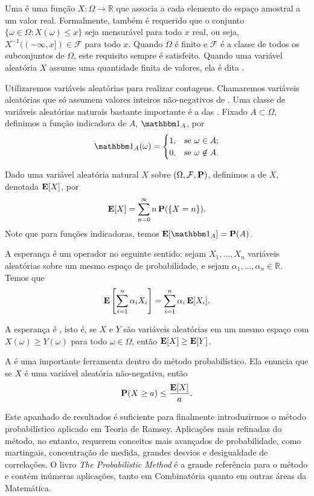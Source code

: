 Uma  é uma função $X: \Omega \to \mathbb{R}$ que associa a cada elemento do espaço amostral a um valor real. Formalmente, também é requerido que o conjunto $\{ \omega \in \Omega : X(\omega) \leq x \}$ seja mensurável para todo $x$ real, ou seja, $X^{-1}( (-\infty,x]) \in \mathcal{F}$ para todo $x$. Quando $\Omega$ é finito e $\mathcal{F}$ é a classe de todos os subconjuntos de $\Omega$, este requisito sempre é satisfeito. Quando uma variável aleatória $X$ assume uma quantidade finita de valores, ela é dita .

Utilizaremos variáveis aleatórias para realizar contagens. Chamaremos  variáveis aleatórias que só assumem valores inteiros não-negativos de . Uma classe de variáveis aleatórias naturais bastante importante é a das . Fixado $A \subset \Omega$, definimos a função indicadora de $A$, $\ind{A}$, por
\[ \ind{A}(\omega) = \begin{cases}
  1, & \text{se } \omega \in A; \\
  0, & \text{se } \omega \not\in A.
\end{cases}\]

Dado uma variável aleatória natural $X$ sobre $(\Omega, \mathcal{F}, \operatorname{\mathbf{P}})$, definimos a  de $X$, denotada $\operatorname{\mathbf{E}}[X]$, por
\[ \operatorname{\mathbf{E}}[X] = \sum_{n = 0}^{\infty} n \operatorname{\mathbf{P}}(\{X = n\}).\]
Note que para funções indicadoras, temos $\expec[\ind{A}] = \prob(A)$.

A esperança é um operador  no seguinte sentido: sejam $X_1, \dots, X_n$ variáveis aleatórias sobre um mesmo espaço de probabilidade, e sejam $\alpha_1, \dots, \alpha_n \in \mathbb{R}$. Temos que
\[ \operatorname{\mathbf{E}}\left[ \sum_{i=1}^n \alpha_i X_i \right] = \sum_{i = 1}^{n} \alpha_i \operatorname{\mathbf{E}}[X_i]. \]

A esperança é , isto é, se $X$ e $Y$ são variáveis aleatórias em um mesmo espaço com $X(\omega) \geq Y(\omega)$ para todo $\omega \in \Omega$, então $\operatorname{\mathbf{E}}[X] \geq \operatorname{\mathbf{E}}[Y]$.

A  é uma importante ferramenta dentro do método probabilístico. Ela enuncia que se $X$ é uma variável aleatória não-negativa, então
\[ \operatorname{\mathbf{P}}(X \geq a) \leq \frac{\operatorname{\mathbf{E}}[X]}{a}. \]

Este apanhado de resultados é suficiente para finalmente introduzirmos o método probabilístico aplicado em Teoria de Ramsey. Aplicações mais refinadas do método, no entanto, requerem conceitos mais avançados de probabilidade, como martingais, concentração de medida, grandes desvios e desigualdade de correlações. O livro \emph{The Probabilistic Method} \cite{alon} é a grande referência para o método e contém inúmeras aplicações, tanto em Combinatória quanto em outras áreas da Matemática.

